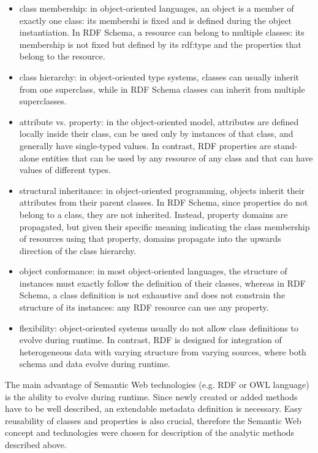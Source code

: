 \documentclass[a4paper,twoside]{article}
\begin{document}
\begin{itemize}

\item class membership: in object-oriented languages, an object is a member of exactly one class: its membershi is fixed and is defined during the object instantiation. In RDF Schema, a resource can belong to multiple classes: its membership is not fixed but defined by its rdf:type and the properties that belong to the resource.

\item class hierarchy: in object-oriented type systems, classes can usually inherit from one superclass, while in RDF Schema classes can inherit from multiple superclasses.

\item attribute vs. property: in the object-oriented model, attributes are defined locally inside their class, can be used only by instances of that class, and generally have single-typed values. In contrast, RDF properties are stand-alone entities that can be used by any resource of any class and that can have values of different types.

\item structural inheritance: in object-oriented programming, objects inherit their attributes from their parent classes. In RDF Schema, since properties do not belong to a class, they are not inherited.  Instead, property domains are propagated, but given their specific meaning indicating the class membership of resources using that property, domains propagate into the upwards direction of the class hierarchy.

\item object conformance: in most object-oriented languages, the structure of instances must exactly follow the definition of their classes, whereas in RDF Schema, a class definition is not exhaustive and does not constrain the structure of its instances: any RDF resource can use any property.

\item flexibility: object-oriented systems usually do not allow class definitions to evolve during runtime. In contrast, RDF is designed for integration of heterogeneous data with varying structure from varying sources, where both schema and data evolve during runtime.

\end{itemize}

The main advantage of Semantic Web technologies (e.g. RDF or OWL language) is the ability to evolve during runtime. Since newly created or added methods have to be well described, an extendable metadata definition is necessary. Easy reusability of classes and properties is also crucial, therefore the Semantic Web concept and technologies were chosen for description of the analytic methods described above.
\end{document}
